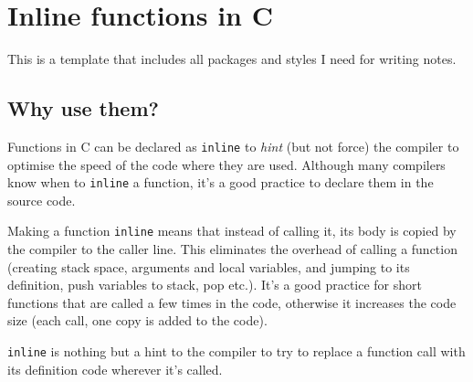 \documentclass[a4paper]{article}
\begin{document}






\newpage
\tableofcontents
\newpage



\section{Inline functions in C}

This is a template that includes all packages and styles I need for writing notes.


\subsection{Why use them?}

Functions in C can be declared as \texttt{inline} to \textit{hint}  (but not force) the compiler to optimise the speed of the code where they are used. Although many compilers know when to \texttt{inline} a function, it's a good practice to declare them in the source code.

Making a function \texttt{inline} means that instead of calling it, its body is copied by the compiler to the caller line. This eliminates the overhead of calling a function (creating stack space, arguments and local variables, and jumping to its definition, push variables to stack, pop etc.). It's a good practice for short functions that are called a few times in the code, otherwise it increases the code size (each call, one copy is added to the code).

\begin{takeaway}
\textup{\texttt{inline}} is nothing but a hint to the compiler to try to replace a function call with its definition code wherever it's called.
\end{takeaway}
\end{document}
